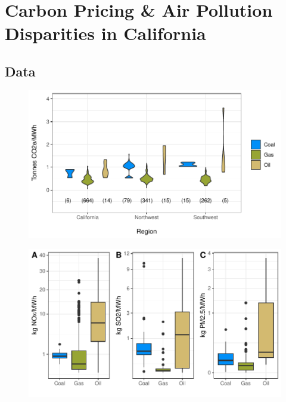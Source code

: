 ~
\newpage
\section{Carbon Pricing \& Air Pollution Disparities in California}

\subsection{Data}



\begin{figure}
    \includegraphics[width=\textwidth]{figures/chapter5_figures/EI_region_violin.pdf}
\end{figure}

\begin{figure}
    \includegraphics[width=\textwidth]{figures/chapter5_figures/local_poll_EI.pdf}
\end{figure}

